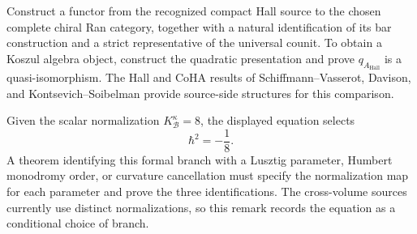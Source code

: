 \begin{remark}
\label{rem:bcai-deep-2}
Construct a functor from the recognized compact Hall source to the
chosen complete chiral Ran category, together with a natural
identification of its bar construction and a strict representative of
the universal counit.  To obtain a Koszul algebra object, construct
the quadratic presentation and prove
$q_{A_{\mathrm{Hall}}}$ is a quasi-isomorphism.  The Hall and CoHA
results of Schiffmann--Vasserot, Davison, and
Kontsevich--Soibelman provide source-side structures for this
comparison.
\end{remark}

\begin{remark}[Normalization equation
$\hbar^2K^\kappa_{\mathcal B}=-1$; \ClaimStatusConditional]
\label{rem:bcai-deep-3}
Given the scalar normalization
$K^\kappa_{\mathcal B}=8$, the displayed equation selects
\[
 \hbar^2=-\frac18.
\]
A theorem identifying this formal branch with a Lusztig parameter,
Humbert monodromy order, or curvature cancellation must specify the
normalization map for each parameter and prove the three
identifications.  The cross-volume sources currently use distinct
normalizations, so this remark records the equation as a conditional
choice of branch.
\end{remark}
